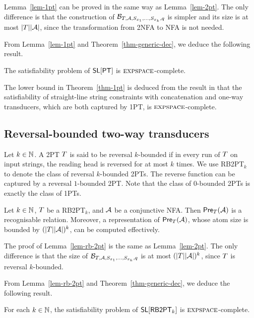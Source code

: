 Lemma~\ref{lem-1pt} can be proved in the same way as Lemma~\ref{lem-2pt}. The only difference is that the construction of $\mathcal{B}_{T, \mathcal{A}, S_{x_1}, \ldots, S_{x_k}, q}$ is simpler and its size is at most $|T| |\mathcal{A}|$, since the transformation from  2NFA to NFA is not needed.

From Lemma~\ref{lem-1pt} and Theorem~\ref{thm-generic-dec}, we deduce the following result.
%
\begin{theorem} \label{thm-1pt}
The satisfiability problem of $\textsf{SL}[\textsf{PT}]$ is $\textsc{expspace}$-complete. 
\end{theorem}

The lower bound in Theorem~\ref{thm-1pt} is deduced from the result in \cite{LB16} that the satisfiability of straight-line string constraints with concatenation and one-way transducers, which are both captured by 1PT, is $\textsc{expspace}$-complete.

\subsection{Reversal-bounded two-way transducers}

Let $k \in \mathbb{N}$. A 2PT $T$ is said  to be reversal $k$-bounded if in every run of $T$ on input strings, the reading head is reversed for at most $k$ times. We use  RB2PT$_k$ to denote the class of reversal $k$-bounded 2PTs. The reverse function can be captured by a reversal $1$-bounded 2PT.
Note that the class of $0$-bounded 2PTs is exactly the class of 1PTs.

\begin{lemma}\label{lem-rb-2pt}
Let $k \in \mathbb{N}$, $T$ be a RB2PT$_k$, and $\mathcal{A}$ be a conjunctive NFA. Then $\textsf{Pre}_{T}(\mathcal{A})$ is a recognisable relation. Moreover, a representation of $\textsf{Pre}_{T}(\mathcal{A})$, whose atom size is bounded by $(|T||\mathcal{A}|)^k$, can be computed effectively.
\end{lemma}

The proof of Lemma~\ref{lem-rb-2pt} is the same as Lemma~\ref{lem-2pt}. The only difference is that the size of $\mathcal{B}_{T, \mathcal{A}, S_{x_1}, \ldots, S_{x_k}, q}$ is at most $(|T| |\mathcal{A}|)^k$, since $T$ is reversal $k$-bounded.

From Lemma~\ref{lem-rb-2pt} and Theorem~\ref{thm-generic-dec}, we deduce the following result.
%
\begin{theorem} \label{thm-rb-2pt}
For each $k \in \mathbb{N}$, the satisfiability problem of $\textsf{SL}[\textsf{RB2PT}_k]$ is $\textsc{expspace}$-complete. 
\end{theorem}

